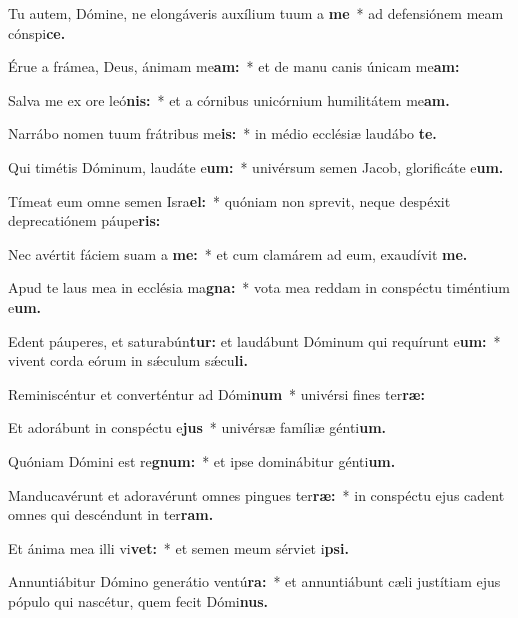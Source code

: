 \item Tu autem, Dómine, ne elongáveris auxílium tuum a \textbf{me}~* ad defensiónem meam cónspi\textbf{ce.}
\item Érue a frámea, Deus, ánimam me\textbf{am:}~* et de manu canis únicam me\textbf{am:}
\item Salva me ex ore leó\textbf{nis:}~* et a córnibus unicórnium humilitátem me\textbf{am.}
\item Narrábo nomen tuum frátribus me\textbf{is:}~* in médio ecclésiæ laudábo \textbf{te.}
\item Qui timétis Dóminum, laudáte e\textbf{um:}~* univérsum semen Jacob, glorificáte e\textbf{um.}
\item Tímeat eum o\-mne semen Isra\textbf{el:}~* quóniam non sprevit, neque despéxit deprecatiónem páupe\textbf{ris:}
\item Nec avértit fáciem suam a \textbf{me:}~* et cum clamárem ad eum, exaudívit \textbf{me.}
\item Apud te laus mea in ecclésia ma\textbf{gna:}~* vota mea reddam in conspéctu timéntium e\textbf{um.}
\item Edent páuperes, et saturabún\textbf{tur:} et laudábunt Dóminum qui requírunt e\textbf{um:}~* vivent corda eórum in sǽculum sǽcu\textbf{li.}
\item Reminiscéntur et converténtur ad Dómi\textbf{num}~* univérsi fines ter\textbf{ræ:}
\item Et adorábunt in conspéctu e\textbf{jus}~* univérsæ famíliæ génti\textbf{um.}
\item Quóniam Dómini est re\textbf{gnum:}~* et ipse dominábitur génti\textbf{um.}
\item Manducavérunt et adoravérunt o\-mnes pingues ter\textbf{ræ:}~* in conspéctu ejus cadent o\-mnes qui descéndunt in ter\textbf{ram.}
\item Et ánima mea illi vi\textbf{vet:}~* et semen meum sérviet i\textbf{psi.}
\item Annuntiábitur Dómino generátio ventú\textbf{ra:}~* et annuntiábunt cæli justítiam ejus pópulo qui nascétur, quem fecit Dómi\textbf{nus.}